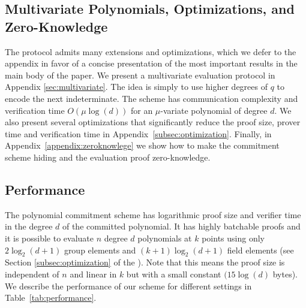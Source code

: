 \subsection{Multivariate Polynomials, Optimizations, and Zero-Knowledge}

The protocol admits many extensions and optimizations, which we defer to the appendix in favor of a concise presentation of the most important results in the main body of the paper. We present a multivariate evaluation protocol in Appendix \ref{sec:multivariate}. The idea is simply to use higher degrees of $q$ to encode the next indeterminate. The scheme has communication complexity and verification time $O(\mu \log(d))$ for an $\mu$-variate polynomial of degree $d$. We also present several optimizations that significantly reduce the proof size, prover time and verification time in Appendix~\ref{subsec:optimization}. Finally, in Appendix~\ref{appendix:zeroknowlege} we show how to make the commitment scheme hiding and the evaluation proof zero-knowledge.%

\subsection{Performance}
The polynomial commitment scheme has logarithmic proof size and verifier time in the degree $d$ of the committed polynomial. 
It has highly batchable proofs and it is possible to evaluate $n$ degree $d$ polynomials at $k$ points using only $2\log_2(d+1)$ group elements and $(k+1)\log_2(d+1)$ field elements (see Section \ref{subsec:optimization} of the \appendixphrase). Note that this means the proof size is independent of $n$ and linear in $k$ but with a small constant $(15 \log(d)$ bytes). 
We describe the performance of our scheme for different settings in Table~\ref{tab:performance}.

